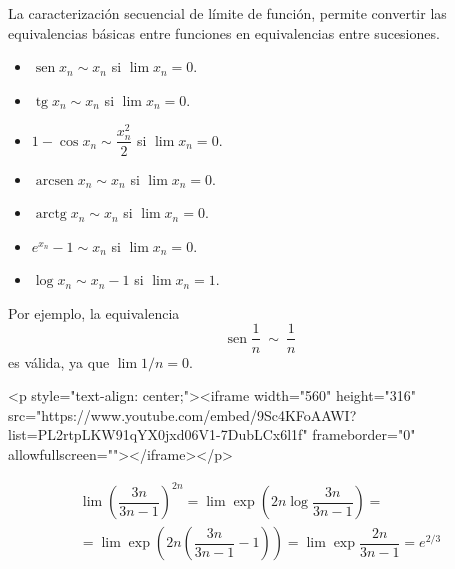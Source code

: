 La caracterización secuencial de límite de función, permite convertir las equivalencias básicas entre funciones en equivalencias entre sucesiones.
%
\begin{itemize}
\item
$\operatorname{sen} x_n  \sim  x_n$ si $\lim x_n=0$.

\item
$\operatorname{tg} x_n  \sim  x_n$ si $\lim x_n=0$.

\item
$1-\cos x_n \sim \dfrac{x_n^2}{2}$ si $\lim x_n=0$.

\item
$\operatorname{arcsen} x_n \sim x_n$ si $\lim x_n=0$.

\item
$\operatorname{arctg} x_n \sim x_n$ si $\lim x_n=0$.

\item
$e^{x_n}-1 \sim x_n$ si $\lim x_n=0$.

\item
$\log x_n \sim x_n-1$ si $\lim x_n=1$.

\end{itemize}

Por ejemplo, la equivalencia
\[
\operatorname{sen}\dfrac{1}{n} \ \sim\ \dfrac{1}{n}
\]
es válida, ya que $\lim 1/n=0$.


\begin{rawhtml}
<p style="text-align: center;"><iframe width="560" height="316" src="https://www.youtube.com/embed/9Sc4KFoAAWI?list=PL2rtpLKW91qYX0jxd06V1-7DubLCx6l1f" frameborder="0" allowfullscreen=""></iframe></p>
\end{rawhtml}

\begin{ejemplo}
\begin{multline*}
\lim\left(\dfrac{3n}{3n-1}\right)^{2n}
 = \lim\exp\left(2n\log\dfrac{3n}{3n-1}\right) =\\
 = \lim\exp\left(2n\left(\dfrac{3n}{3n-1}-1\right)\right) =\lim\exp \dfrac{2n}{3n-1} = e^{2/3}
\tag*{\fej}
\end{multline*}
\end{ejemplo}


